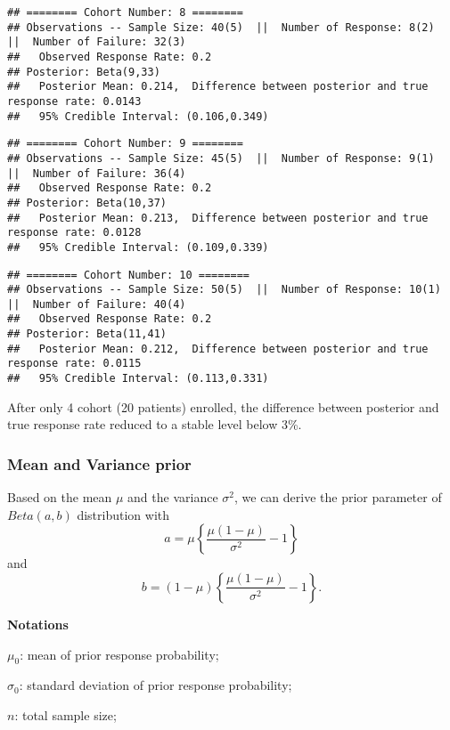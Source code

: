 \documentclass[]{article}
\begin{document}
\begin{verbatim}
## ======== Cohort Number: 8 ======== 
## Observations -- Sample Size: 40(5)  ||  Number of Response: 8(2)  ||  Number of Failure: 32(3)
##   Observed Response Rate: 0.2
## Posterior: Beta(9,33) 
##   Posterior Mean: 0.214,  Difference between posterior and true response rate: 0.0143
##   95% Credible Interval: (0.106,0.349)
\end{verbatim}

\begin{verbatim}
## ======== Cohort Number: 9 ======== 
## Observations -- Sample Size: 45(5)  ||  Number of Response: 9(1)  ||  Number of Failure: 36(4)
##   Observed Response Rate: 0.2
## Posterior: Beta(10,37) 
##   Posterior Mean: 0.213,  Difference between posterior and true response rate: 0.0128
##   95% Credible Interval: (0.109,0.339)
\end{verbatim}

\begin{verbatim}
## ======== Cohort Number: 10 ======== 
## Observations -- Sample Size: 50(5)  ||  Number of Response: 10(1)  ||  Number of Failure: 40(4)
##   Observed Response Rate: 0.2
## Posterior: Beta(11,41) 
##   Posterior Mean: 0.212,  Difference between posterior and true response rate: 0.0115
##   95% Credible Interval: (0.113,0.331)
\end{verbatim}


After only 4 cohort (20 patients) enrolled, the difference between
posterior and true response rate reduced to a stable level below 3\%.

\subsubsection{Mean and Variance prior}\label{mean-and-variance-prior}

Based on the mean \(\mu\) and the variance \(\sigma^2\), we can derive
the prior parameter of \(Beta(a,b)\) distribution with
\[a=\mu\left\{\dfrac{\mu(1-\mu)}{\sigma^2}-1\right\}\] and
\[b=(1-\mu)\left\{\dfrac{\mu(1-\mu)}{\sigma^2}-1\right\}.\]

\textbf{Notations}

\(\mu_0\): mean of prior response probability;

\(\sigma_0\): standard deviation of prior response probability;

\(n\): total sample size;
\end{document}
